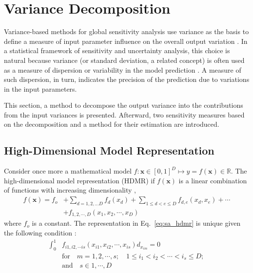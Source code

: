 \section{Variance Decomposition}\label{sec:sa_variance_decomposition}

Variance-based methods for global sensitivity analysis use variance as the basis to define a measure of input parameter influence on the overall output variation \cite{Cacuci2004}.
In a statistical framework of sensitivity and uncertainty analysis, 
this choice is natural because variance (or standard deviation, a related concept) is often used as a measure of dispersion or variability in the model prediction \cite{Saltelli2008}.
A measure of such dispersion, in turn, indicates the precision of the prediction due to variations in the input parameters.

This section, a method to decompose the output variance into the contributions from the input variances is presented.
Afterward, two sensitivity measures based on the decomposition and a method for their estimation are introduced.

\subsection{High-Dimensional Model Representation}\label{sub:sa_hdmr}

Consider once more a mathematical model $f: \mathbf{x} \in [0,1]^D \mapsto y = f(\mathbf{x}) \in \mathbb{R}$.
The high-dimensional model representation (HDMR) if $f(\mathbf{x})$ is a linear combination of functions with increasing dimensionality \cite{Li2001},
\begin{equation}
	\begin{split}
		f(\mathbf{x}) = f_o & + \sum_{d=1,2,...D} f_d(x_d) + \sum_{1\leq d < e \leq D} f_{d,e} (x_d, x_e) + \cdots  \\
	                      & + f_{1,2,\cdots,D} (x_1, x_2, \cdots, x_D)
	\end{split}
\label{eq:sa_hdmr}
\end{equation}
where $f_o$ is a constant. 
The representation in Eq.~\ref{eq:sa_hdmr} is unique given the following condition \cite{Sobol2001}:
\begin{equation}
  \begin{split}
    \int_{0}^{1} & f_{i1, i2, \cdots is}(x_{i1}, x_{i2}, \cdots, x_{is}) d_{x_{im}} = 0  \\
                 & \text{for}\quad m = 1,2,\cdots,s;\quad 1\leq i_1 < i_2 < \cdots < i_s \leq D; \\
                 & \text{and} \quad s \in {1,\cdots,D}
   \end{split}
\label{eq:sa_unicity}
\end{equation}

